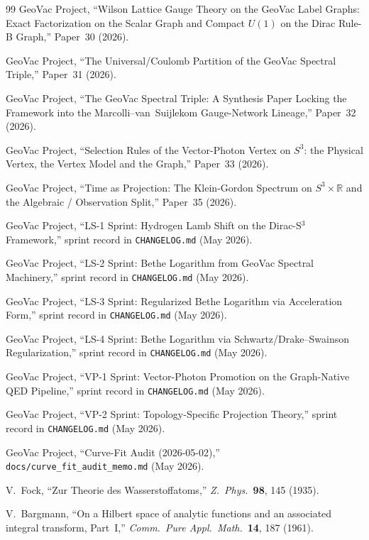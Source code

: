 \documentclass[11pt]{article}
\begin{document}
\begin{thebibliography}{99}
GeoVac Project, ``Wilson Lattice Gauge Theory on the GeoVac Label
Graphs: Exact Factorization on the Scalar Graph and Compact $U(1)$ on the
Dirac Rule-B Graph,'' Paper~30 (2026).

GeoVac Project, ``The Universal/Coulomb Partition of the GeoVac Spectral Triple,'' Paper~31 (2026).

GeoVac Project, ``The GeoVac Spectral Triple: A Synthesis Paper Locking the Framework into the Marcolli--van~Suijlekom Gauge-Network Lineage,''
Paper~32 (2026).

GeoVac Project, ``Selection Rules of the Vector-Photon Vertex on $S^3$:
the Physical Vertex, the Vertex Model and the Graph,'' Paper~33 (2026).

GeoVac Project, ``Time as Projection: The Klein-Gordon Spectrum on
$S^3 \times \mathbb{R}$ and the Algebraic / Observation Split,''
Paper~35 (2026).

GeoVac Project, ``LS-1 Sprint: Hydrogen Lamb Shift on the Dirac-S$^3$
Framework,'' sprint record in \texttt{CHANGELOG.md} (May 2026).

GeoVac Project, ``LS-2 Sprint: Bethe Logarithm from GeoVac Spectral
Machinery,'' sprint record in \texttt{CHANGELOG.md} (May 2026).

GeoVac Project, ``LS-3 Sprint: Regularized Bethe Logarithm via
Acceleration Form,'' sprint record in \texttt{CHANGELOG.md} (May 2026).

GeoVac Project, ``LS-4 Sprint: Bethe Logarithm via Schwartz/Drake--Swainson
Regularization,'' sprint record in \texttt{CHANGELOG.md} (May 2026).

GeoVac Project, ``VP-1 Sprint: Vector-Photon Promotion on the
Graph-Native QED Pipeline,'' sprint record in \texttt{CHANGELOG.md} (May 2026).

GeoVac Project, ``VP-2 Sprint: Topology-Specific Projection Theory,''
sprint record in \texttt{CHANGELOG.md} (May 2026).

GeoVac Project, ``Curve-Fit Audit (2026-05-02),''
\texttt{docs/curve\_fit\_audit\_memo.md} (May 2026).

V.~Fock, ``Zur Theorie des Wasserstoffatoms,''
\textit{Z.\ Phys.}\ \textbf{98}, 145 (1935).

V.~Bargmann, ``On a Hilbert space of analytic functions and an
associated integral transform, Part~I,'' \textit{Comm.\ Pure Appl.\
Math.}\ \textbf{14}, 187 (1961).


\end{thebibliography}
\end{document}
